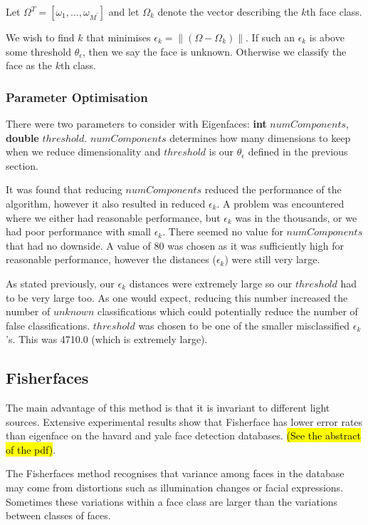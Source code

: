 \documentclass{article}
\begin{document}
Let $\Omega^T = [\omega_1, \ldots, \omega_{M^\prime}]$ and let $\Omega_k$ denote the vector describing the $k$th face class.

We wish to find $k$ that minimises $\epsilon_k = \|(\Omega - \Omega_k)\|$. If such an $\epsilon_k$ is above some threshold $\theta_\epsilon$, then we say the face is unknown. Otherwise we classify the face as the $k$th class.

\subsubsection{Parameter Optimisation}
There were two parameters to consider with Eigenfaces: \textbf{int} $numComponents$, \textbf{double} $threshold$. $numComponents$ determines how many dimensions to keep when we reduce dimensionality and $threshold$ is our $\theta_\epsilon$ defined in the previous section.

It was found that reducing $numComponents$ reduced the performance of the algorithm, however it also resulted in reduced $\epsilon_k$. A problem was encountered where we either had reasonable performance, but $\epsilon_k$ was in the thousands, or we had poor performance with small $\epsilon_k$. There seemed no value for $numComponents$ that had no downside. A value of 80 was chosen as it was sufficiently high for reasonable performance, however the distances ($\epsilon_k$) were still very large.

As stated previously, our $\epsilon_k$ distances were extremely large so our $threshold$ had to be very large too. As one would expect, reducing this number increased the number of $unknown$ classifications which could potentially reduce the number of false classifications. $threshold$ was chosen to be one of the smaller misclassified $\epsilon_k$'s. This was 4710.0 (which is extremely large).

\subsection{Fisherfaces}
The main advantage of this method is that it is invariant to different light sources. Extensive experimental results show that Fisherface has lower error rates than eigenface on the havard and yale face detection databases. \hl{(See the abstract of the pdf)}.

The Fisherfaces method recognises that variance among faces in the database may come from distortions such as illumination changes or facial expressions. Sometimes these variations within a face class are larger than the variations between classes of faces.
\end{document}
